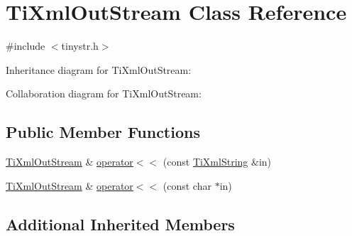 \hypertarget{class_ti_xml_out_stream}{\section{Ti\+Xml\+Out\+Stream Class Reference}
\label{class_ti_xml_out_stream}
}


{\ttfamily \#include $<$tinystr.\+h$>$}



Inheritance diagram for Ti\+Xml\+Out\+Stream\+:


Collaboration diagram for Ti\+Xml\+Out\+Stream\+:
\subsection*{Public Member Functions}
\begin{DoxyCompactItemize}
\item 
\hyperlink{class_ti_xml_out_stream}{Ti\+Xml\+Out\+Stream} \& \hyperlink{class_ti_xml_out_stream_a3640dcb1c0903be3bc6966cdc9a79db6}{operator$<$$<$} (const \hyperlink{class_ti_xml_string}{Ti\+Xml\+String} \&in)
\item 
\hyperlink{class_ti_xml_out_stream}{Ti\+Xml\+Out\+Stream} \& \hyperlink{class_ti_xml_out_stream_af2117e5a8cbfcb69544804ad2859bfb6}{operator$<$$<$} (const char $\ast$in)
\end{DoxyCompactItemize}
\subsection*{Additional Inherited Members}


